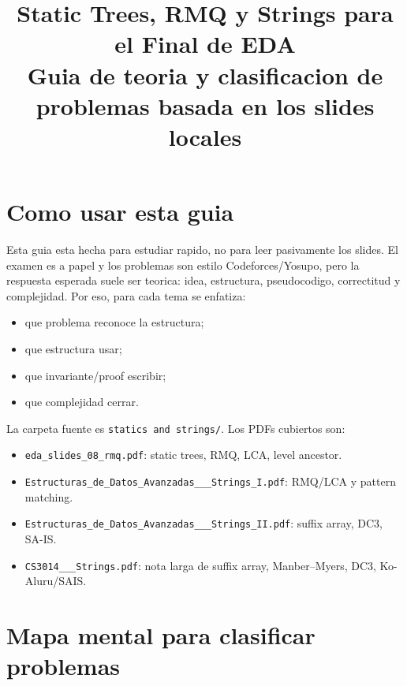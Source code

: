 \documentclass[10pt]{article}
\title{Static Trees, RMQ y Strings para el Final de EDA\\
\large Guia de teoria y clasificacion de problemas basada en los slides locales}
\author{}
\date{}
\begin{document}
\sloppy
\maketitle

\section*{Como usar esta guia}
Esta guia esta hecha para estudiar rapido, no para leer pasivamente los slides.
El examen es a papel y los problemas son estilo Codeforces/Yosupo, pero la
respuesta esperada suele ser teorica: idea, estructura, pseudocodigo,
correctitud y complejidad. Por eso, para cada tema se enfatiza:
\begin{itemize}[leftmargin=*]
\item que problema reconoce la estructura;
\item que estructura usar;
\item que invariante/proof escribir;
\item que complejidad cerrar.
\end{itemize}

La carpeta fuente es \texttt{statics and strings/}. Los PDFs cubiertos son:
\begin{itemize}[leftmargin=*]
\item \texttt{eda\_slides\_08\_rmq.pdf}: static trees, RMQ, LCA, level ancestor.
\item \texttt{Estructuras\_de\_Datos\_Avanzadas\_\_\_Strings\_I.pdf}: RMQ/LCA y pattern matching.
\item \texttt{Estructuras\_de\_Datos\_Avanzadas\_\_\_Strings\_II.pdf}: suffix array, DC3, SA-IS.
\item \texttt{CS3014\_\_\_Strings.pdf}: nota larga de suffix array, Manber--Myers, DC3, Ko-Aluru/SAIS.
\end{itemize}

\tableofcontents
\newpage

\section{Mapa mental para clasificar problemas}
\end{document}
